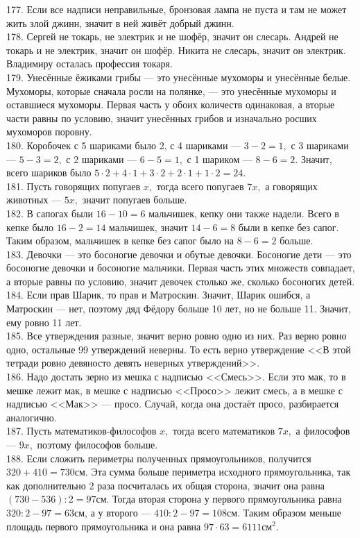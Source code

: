 177. Если все надписи неправильные, бронзовая лампа не пуста и там не может жить злой джинн, значит в ней живёт добрый джинн.\\
178. Сергей не токарь, не электрик и не шофёр, значит он слесарь. Андрей не токарь и не электрик, значит он шофёр. Никита не слесарь, значит он электрик. Владимиру осталась профессия токаря.\\
179. Унесённые ёжиками грибы --- это унесённые мухоморы и унесённые белые. Мухоморы, которые сначала росли на полянке, --- это унесённые мухоморы и оставшиеся мухоморы. Первая часть у обоих количеств одинаковая, а вторые части равны по условию, значит унесённых грибов и изначально росших мухоморов поровну.\\
180. Коробочек с 5 шариками было 2, с 4 шариками --- $3-2=1,$ с 3 шариками --- $5-3=2,$ с 2 шариками --- $6-5=1,$ с 1 шариком --- $8-6=2.$ Значит, всего шариков было $5\cdot2+4\cdot1+3\cdot2+2\cdot1+1\cdot2=24.$\\
181. Пусть говорящих попугаев $x,$ тогда всего попугаев $7x,$ а говорящих животных --- $5x,$ значит попугаев больше.\\
182. В сапогах были $16-10=6$ мальчишек, кепку они также надели. Всего в кепке было $16-2=14$ мальчишек, значит $14-6=8$ были в кепке без сапог. Таким образом, мальчишек в кепке без сапог было на $8-6=2$ больше.\\
183. Девочки --- это босоногие девочки и обутые девочки. Босоногие дети --- это босоногие девочки и босоногие мальчики. Первая часть этих множеств совпадает, а вторые равны по условию, значит девочек столько же, сколько босоногих детей.\\
184. Если прав Шарик, то прав и Матроскин. Значит, Шарик ошибся, а Матроскин --- нет, поэтому дяд Фёдору больше 10 лет, но не больше 11. Значит, ему ровно 11 лет.\\
185. Все утверждения разные, значит верно ровно одно из них. Раз верно ровно одно, остальные 99 утверждений неверны. То есть верно утверждение <<В этой тетради ровно девяносто девять неверных утверждений>>.\\
186. Надо достать зерно из мешка с надписью <<Смесь>>. Если это мак, то в мешке лежит мак, в мешке с надписью <<Просо>> лежит смесь, а в мешке с надписью <<Мак>> --- просо. Случай, когда она достаёт просо, разбирается аналогично.\\
187. Пусть математиков-философов $x,$ тогда всего математиков $7x,$ а философов --- $9x,$ поэтому философов больше.\\
188. Если сложить периметры полученных прямоугольников, получится $320+410=730$см. Эта сумма больше периметра исходного прямоугольника, так как дополнительно 2 раза посчиталась их общая сторона, значит она равна $(730-536):2=97$см. Тогда вторая сторона у первого прямоугольника равна $320:2-97=63$см, а у второго --- $410:2-97=108$см. Таким образом меньше площадь первого прямоугольника и она равна $97\cdot63=6111\text{см}^2.$\\
